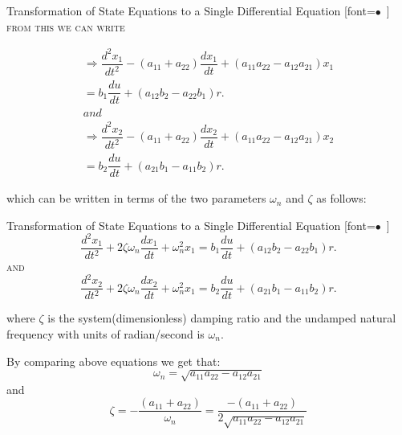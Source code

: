 \documentclass[journal,12pt,twocolumn]{IEEEtran}
\renewcommand\thesection{\arabic{section}}
\begin{document}
\begin{enumerate}[label=\arabic*.,ref=\thesection.\theenumi]
{Transformation of State Equations to a Single Differential Equation}
[font=$\bullet$~\normalfont\scshape\color{red!50!black}]
from this we can write

\begin{align}
\Rightarrow \dfrac{d^2x_1}{dt^2} - (a_{11} + a_{22})\dfrac{dx_1}{dt} + (a_{11}a_{22} - a_{12}a_{21})x_1  \\ = b_1\dfrac{du}{dt} + (a_{12}b_2 - a_{22}b_1)r.
\\
and
\\
\Rightarrow 
\dfrac{d^2x_2}{dt^2} - (a_{11} + a_{22})\dfrac{dx_2}{dt} + (a_{11}a_{22} - a_{12}a_{21})x_2 \\ = b_2\dfrac{du}{dt} + (a_{21}b_1 - a_{11}b_2)r.
\end{align}


which can be written in terms of the two parameters $\omega_n$ and $\zeta$ as follows: 




{Transformation of State Equations to a Single Differential Equation}
[font=$\bullet$~\normalfont\scshape\color{red!50!black}]
$$\dfrac{d^2x_1}{dt^2} + 2\zeta\omega_n\dfrac{dx_1}{dt} + \omega_n^2x_1 = b_1\dfrac{du}{dt} + (a_{12}b_2 - a_{22}b_1)r.$$
and
$$\dfrac{d^2x_2}{dt^2} + 2\zeta\omega_n\dfrac{dx_2}{dt} + \omega_n^2x_1 = b_2\dfrac{du}{dt} + (a_{21}b_1 - a_{11}b_2)r.$$



where $\zeta$ is the system(dimensionless) damping ratio and the undamped natural frequency with units of radian/second is $\omega_n$.


By comparing above equations we get that:
$$\omega_n = \sqrt{a_{11}a_{22} - a_{12}a_{21}}$$
and
$$\zeta = -\dfrac{(a_{11}+a_{22})}{\omega_n} = \dfrac{-(a_{11} + a_{22})}{2\sqrt{a_{11}a_{22} - a_{12}a_{21}}}$$




\end{enumerate}
\end{document}
